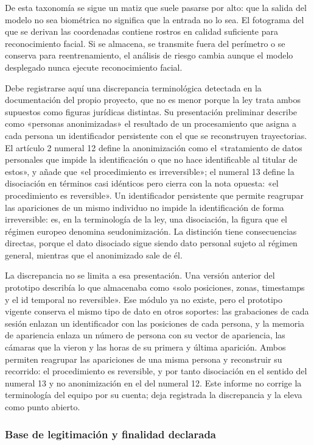 De esta taxonomía se sigue un matiz que suele pasarse por alto: que la
salida del modelo no sea biométrica no significa que la entrada no lo
sea. El fotograma del que se derivan las coordenadas contiene rostros en
calidad suficiente para reconocimiento facial. Si se almacena, se
transmite fuera del perímetro o se conserva para reentrenamiento, el
análisis de riesgo cambia aunque el modelo desplegado nunca ejecute
reconocimiento facial.

Debe registrarse aquí una discrepancia terminológica detectada en la
documentación del propio proyecto, que no es menor porque la ley trata
ambos supuestos como figuras jurídicas distintas. Su presentación
preliminar describe como «personas anonimizadas» el resultado de un
procesamiento que asigna a cada persona un identificador persistente con
el que se reconstruyen trayectorias. El artículo 2 numeral 12 define la
anonimización como el «tratamiento de datos personales que impide la
identificación o que no hace identificable al titular de estos», y añade
que «el procedimiento es irreversible»; el numeral 13 define la
disociación en términos casi idénticos pero cierra con la nota opuesta:
«el procedimiento es reversible». Un identificador persistente que
permite reagrupar las apariciones de un mismo individuo no impide la
identificación de forma irreversible: es, en la terminología de la ley,
una disociación, la figura que el régimen europeo denomina
seudonimización. La distinción tiene consecuencias directas, porque el
dato disociado sigue siendo dato personal sujeto al régimen general,
mientras que el anonimizado sale de él.

La discrepancia no se limita a esa presentación. Una versión anterior
del prototipo describía lo que almacenaba como «solo posiciones, zonas,
timestamps y el id temporal no reversible». Ese módulo ya no existe, pero el
prototipo vigente conserva el mismo tipo de dato en otros soportes: las
grabaciones de cada sesión enlazan un identificador con las posiciones de cada
persona, y la memoria de apariencia enlaza un número de persona con su vector
de apariencia, las cámaras que la vieron y las horas de su primera y última
aparición. Ambos permiten reagrupar las apariciones de una misma persona y
reconstruir su recorrido: el procedimiento es reversible, y por tanto
disociación en el sentido del numeral 13 y no anonimización en el del numeral
12. Este informe no corrige la terminología del equipo por su cuenta; deja
registrada la discrepancia y la eleva como punto abierto.

\subsubsection{Base de legitimación y finalidad declarada}

